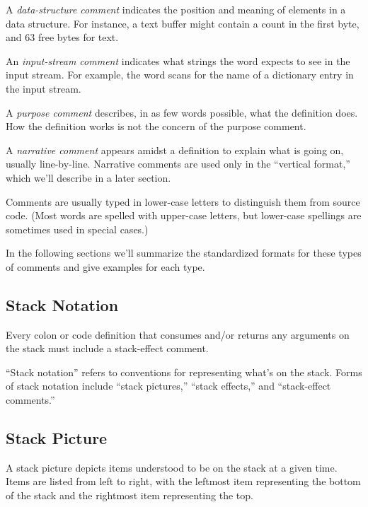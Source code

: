A \emph{data-structure comment}
indicates the position and meaning of elements in a data structure.
For instance, a text buffer might contain a count in the first byte,
and 63 free bytes for text.

An \emph{input-stream comment}
indicates what strings the word expects to see in the input stream.
For example, the \Forth{} word  scans for the name of a
dictionary entry in the input stream.

A \emph{purpose comment}
describes, in as few words possible, what the definition does.  How
the definition works is not the concern of the purpose comment.

A \emph{narrative comment}
appears amidst a definition to explain what is going on, usually
line-by-line.  Narrative comments are used only in the ``vertical
format,'' which we'll describe in a later section.

Comments are usually typed in lower-case letters to distinguish them
from source code.  (Most \Forth{} words are spelled with upper-case
letters, but lower-case spellings are sometimes used in special cases.)

In the following sections we'll summarize the standardized formats
for these types of comments and give examples for each type.

\subsection{Stack Notation}
\begin{tip}
Every colon or code definition that consumes and/or returns any arguments
on the stack must include a stack-effect comment.
\end{tip}


``Stack notation'' refers to conventions for representing what's on
the stack.  Forms of stack notation include ``stack pictures,''
``stack effects,'' and ``stack-effect comments.''

\subsection{Stack Picture}

A stack picture depicts items understood to be on the stack at a given
time.  Items are listed from left to right, with the leftmost item
representing the bottom of the stack and the rightmost item
representing the top.

